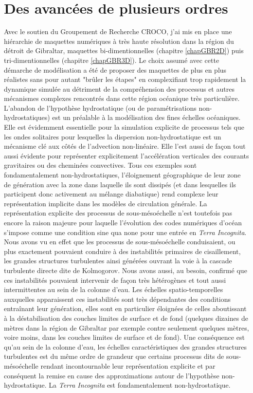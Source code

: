\section{Des avancées de plusieurs ordres}
Avec le soutien du Groupement de Recherche CROCO, j'ai mis en place une hiérarchie de maquettes numériques à très haute résolution dans la région du détroit de Gibraltar, maquettes bi-dimentionnelles (chapitre \ref{chapGBR2D}) puis tri-dimentionnelles (chapitre \ref{chapGBR3D}). Le choix assumé avec cette démarche de modélisation a été de proposer des maquettes de plus en plus réalistes sans pour autant "brûler les étapes" en complexifiant trop rapidement la dynamique simulée au détriment de la compréhension des processus et autres mécanismes complexes rencontrés dans cette région océanique très particulière. \\
L'abandon de l'hypothèse hydrostatique (ou de paramétrisations non-hydrostatiques) est un préalable à la modélisation des fines échelles océaniques. Elle est évidemment essentielle pour la simulation explicite de processus tels que les ondes solitaires pour lesquelles la dispersion non-hydrostatique est un mécanisme clé aux côtés de l'advection non-linéaire. Elle l'est aussi de façon tout aussi évidente pour représenter explicitement l'accélération verticales des courants gravitaires ou des cheminées convectives. Tous ces exemples sont fondamentalement non-hydrostatiques, l'éloignement géographique de leur zone de génération avec la zone dans laquelle ils sont dissipés (et dans lesquelles ils participent donc activement au mélange diabatique) rend complexe leur représentation implicite dans les modèles de circulation générale. La représentation explicite des processus de sous-mésoéchelle n'est toutefois pas encore la raison majeure pour laquelle l'évolution des codes numériques d'océan s'impose comme une condition sine qua none pour une entrée en \textit{Terra Incognita}. Nous avons vu en effet que les processus de sous-mésoéchelle conduisaient, ou plus exactement pouvaient conduire à des instabilités primaires de cisaillement, les grandes structures turbulentes ainsi générées ouvrant la voie à la cascade turbulente directe dite de Kolmogorov. Nous avons aussi, au besoin, confirmé que ces instabilités pouvaient intervenir de façon très hétérogènes et tout aussi intermittentes au sein de la colonne d'eau. Les échelles spatio-temporelles auxquelles apparaissent ces instabilités sont très dépendantes des conditions entraînant leur génération, elles sont en particulier éloignées de celles aboutissant à la déstabilisation des couches limites de surface et de fond (quelques dizaines de mètres dans la région de Gibraltar par exemple contre seulement quelques mètres, voire moins, dans les couches limites de surface et de fond). Une conséquence est qu'au sein de la colonne d'eau, les échelles caractéristiques des grandes structures turbulentes est du même ordre de grandeur que certains processus dits de sous-mésoéchelle rendant incontournable leur représentation explicite et par conséquent la remise en cause des approximations autour de l'hypothèse non-hydrostatique. La \textit{Terra Incognita} est fondamentalement non-hydrostatique. \\

